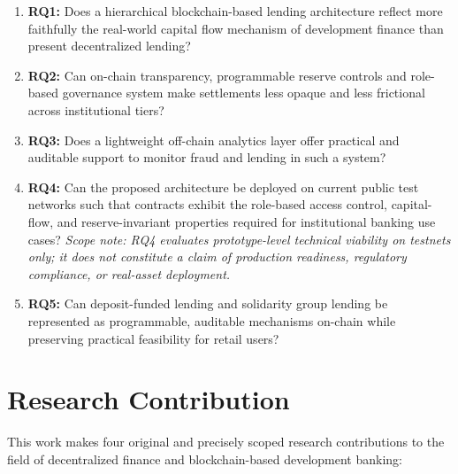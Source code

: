 \documentclass[12pt,a4paper]{report}
\begin{document}
\begin{enumerate}[noitemsep]
\item \textbf{RQ1:} Does a hierarchical blockchain-based lending architecture reflect more faithfully the real-world capital flow mechanism of development finance than present decentralized lending?
\item \textbf{RQ2:} Can on-chain transparency, programmable reserve controls and role-based governance system make settlements less opaque and less frictional across institutional tiers?
\item \textbf{RQ3:} Does a lightweight off-chain analytics layer offer practical and auditable support to monitor fraud and lending in such a system?
\item \textbf{RQ4:} Can the proposed architecture be deployed on current public test networks such that contracts exhibit the role-based access control, capital-flow, and reserve-invariant properties required for institutional banking use cases? \textit{Scope note: RQ4 evaluates prototype-level technical viability on testnets only; it does not constitute a claim of production readiness, regulatory compliance, or real-asset deployment.}
\item \textbf{RQ5:} Can deposit-funded lending and solidarity group lending be represented as programmable, auditable mechanisms on-chain while preserving practical feasibility for retail users?
\end{enumerate}

\section{Research Contribution}
\label{sec:research-contribution}

This work makes four original and precisely scoped research contributions to the field of decentralized finance and blockchain-based development banking:
\end{document}
